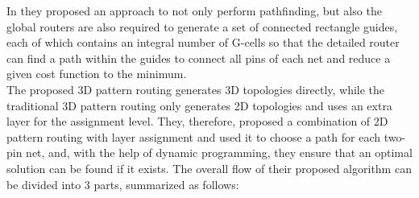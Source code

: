 \documentclass[conference]{IEEEtran}
\begin{document}
\medskip
\par
In \cite{b13} they proposed an approach to not only perform pathfinding, but also the global routers are also required to generate a set of connected rectangle guides,  each of which contains an integral number of G-cells so that the detailed router can find a path within the guides to connect all pins of each net and reduce a given cost function to the minimum. \\
The proposed 3D pattern routing generates 3D topologies directly, while the traditional 3D pattern routing only generates 2D topologies and uses an extra layer for the assignment level. They, therefore, proposed a combination of 2D pattern routing with layer assignment and used it to choose a path for each two-pin net, and, with the help of dynamic programming, they ensure that an optimal solution can be found if it exists.
The overall flow of their proposed algorithm can be divided into 3 parts, summarized as follows:
\end{document}
